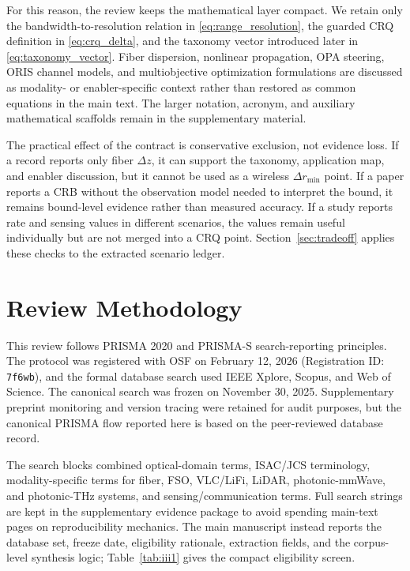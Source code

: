 \documentclass[letterpaper,journal]{IEEEtran}
\begin{document}
For this reason, the review keeps the mathematical layer compact. We retain only the bandwidth-to-resolution relation in \eqref{eq:range_resolution}, the guarded CRQ definition in \eqref{eq:crq_delta}, and the taxonomy vector introduced later in \eqref{eq:taxonomy_vector}. Fiber dispersion, nonlinear propagation, OPA steering, ORIS channel models, and multiobjective optimization formulations are discussed as modality- or enabler-specific context rather than restored as common equations in the main text. The larger notation, acronym, and auxiliary mathematical scaffolds remain in the supplementary material.

The practical effect of the contract is conservative exclusion, not evidence loss. If a record reports only fiber \(\Delta z\), it can support the taxonomy, application map, and enabler discussion, but it cannot be used as a wireless \(\Delta r_{\min}\) point. If a paper reports a CRB without the observation model needed to interpret the bound, it remains bound-level evidence rather than measured accuracy. If a study reports rate and sensing values in different scenarios, the values remain useful individually but are not merged into a CRQ point. Section~\ref{sec:tradeoff} applies these checks to the extracted scenario ledger.

\section{Review Methodology}
\label{sec:methodology}

This review follows PRISMA 2020 and PRISMA-S search-reporting principles. The protocol was registered with OSF on February 12, 2026 (Registration ID: \texttt{7f6wb}), and the formal database search used IEEE Xplore, Scopus, and Web of Science. The canonical search was frozen on November 30, 2025. Supplementary preprint monitoring and version tracing were retained for audit purposes, but the canonical PRISMA flow reported here is based on the peer-reviewed database record.

The search blocks combined optical-domain terms, ISAC/JCS terminology, modality-specific terms for fiber, FSO, VLC/LiFi, LiDAR, photonic-mmWave, and photonic-THz systems, and sensing/communication terms. Full search strings are kept in the supplementary evidence package to avoid spending main-text pages on reproducibility mechanics. The main manuscript instead reports the database set, freeze date, eligibility rationale, extraction fields, and the corpus-level synthesis logic; Table~\ref{tab:iii1} gives the compact eligibility screen.
\end{document}

